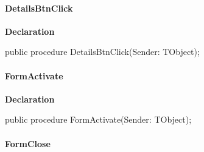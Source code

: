 \documentclass{report}
\newif\ifpdf
\begin{document}
\paragraph*{DetailsBtnClick}\hspace*{\fill}

\label{uninstall.TRMForm-DetailsBtnClick}
\begin{list}{}{
\setlength{\itemindent}{0cm}
\setlength{\listparindent}{0cm}
\setlength{\leftmargin}{\evensidemargin}
\addtolength{\leftmargin}{\tmplength}
\settowidth{\labelsep}{X}
\addtolength{\leftmargin}{\labelsep}
\setlength{\labelwidth}{\tmplength}
}
\item[\textbf{Declaration}\hfill]
\ifpdf
\begin{flushleft}
\fi
\begin{ttfamily}
public procedure DetailsBtnClick(Sender: TObject);\end{ttfamily}

\ifpdf
\end{flushleft}
\fi

\end{list}
\paragraph*{FormActivate}\hspace*{\fill}

\label{uninstall.TRMForm-FormActivate}
\begin{list}{}{
\setlength{\itemindent}{0cm}
\setlength{\listparindent}{0cm}
\setlength{\leftmargin}{\evensidemargin}
\addtolength{\leftmargin}{\tmplength}
\settowidth{\labelsep}{X}
\addtolength{\leftmargin}{\labelsep}
\setlength{\labelwidth}{\tmplength}
}
\item[\textbf{Declaration}\hfill]
\ifpdf
\begin{flushleft}
\fi
\begin{ttfamily}
public procedure FormActivate(Sender: TObject);\end{ttfamily}

\ifpdf
\end{flushleft}
\fi

\end{list}
\paragraph*{FormClose}\hspace*{\fill}
\end{document}
